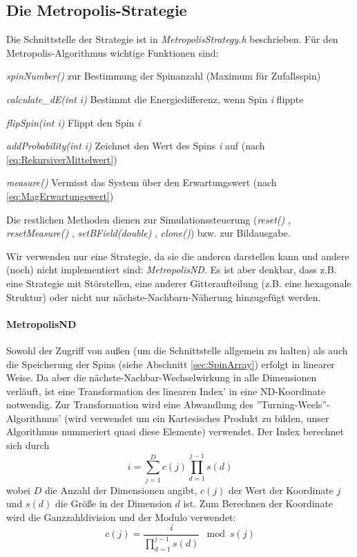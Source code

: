 \subsection{Die Metropolis-Strategie}
Die Schnittstelle der Strategie ist in  \textit{MetropolisStrategy.h} beschrieben. Für den Metropolis-Algorithmus wichtige Funktionen sind:
\begin{list}{}{}
\item  \textit{spinNumber()} zur Bestimmung der Spinanzahl (Maximum für Zufallsspin)
\item  \textit{calculate\_dE(int i)} Bestimmt die Energiedifferenz, wenn Spin \textit{i} flippte
\item  \textit{flipSpin(int i)} Flippt den Spin \textit{i}
\item  \textit{addProbability(int i)} Zeichnet den Wert des Spins \textit{i} auf (nach \eqref{eq:RekursiverMittelwert})
\item  \textit{measure()} Vermisst das System über den Erwartungswert (nach \eqref{eq:MagErwartungswert})
\end{list}
Die restlichen Methoden dienen zur Simulationssteuerung (\textit{reset()} , 
\textit{resetMeasure()} , 
\textit{setBField(double)} , 
\textit{clone()})  bzw. zur Bildausgabe. 

Wir verwenden nur eine Strategie, da sie die anderen darstellen kann und andere (noch) nicht implementiert sind: \textit{MetropolisND}. Es ist aber denkbar, dass z.B. eine Strategie mit Störstellen, eine anderer Gitteraufteilung (z.B. eine hexagonale Struktur) oder nicht nur nächste-Nachbarn-Näherung hinzugefügt werden.

\paragraph{MetropolisND}
Sowohl der Zugriff von außen (um die Schnittstelle allgemein zu halten) als auch die Speicherung der Spins (siehe Abschnitt \ref{sec:SpinArray}) erfolgt in linearer Weise. Da aber die nächste-Nachbar-Wechselwirkung in alle Dimensionen verläuft, ist eine Transformation des linearen Index' in eine ND-Koordinate notwendig. Zur Transformation wird eine Abwandlung des ''Turning-Weels''-Algorithmus' (wird verwendet um ein Kartesisches Produkt zu bilden, unser Algorithmus nummeriert quasi diese Elemente) verwendet. Der Index berechnet sich durch
\begin{equation}
i = \sum_{j=1}^D{ c(j)  \prod_{d=1}^{j-1} { s(d) }}
\end{equation}
wobei $D$ die Anzahl der Dimensionen angibt, $c(j)$ der Wert der Koordinate $j$ und $s(d)$ die Größe in der Dimension $d$ ist. 
Zum Berechnen der Koordinate wird die Ganzzahldivision und der Modulo verwendet:
\begin{equation}
c(j) = \frac{i}{\prod_{d=1}^{j-1} {s(d)} } \mod s(j) 
\end{equation}

